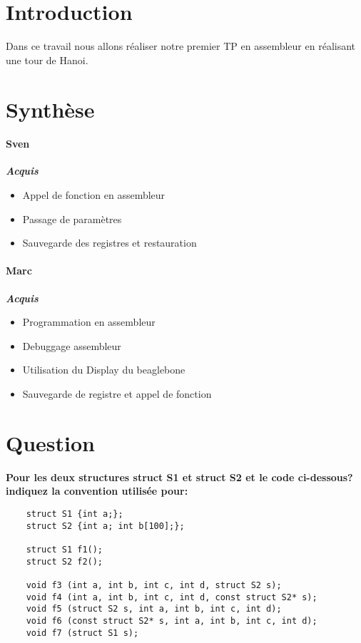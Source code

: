 \section{Introduction}
Dans ce travail nous allons réaliser notre premier TP en assembleur en réalisant une tour de Hanoi.
\section{Synthèse}

\paragraph{Sven}

\textbf{\textit{Acquis}}
\begin{itemize}
    \item Appel de fonction en assembleur
    \item Passage de paramètres
    \item Sauvegarde des registres et restauration
\end{itemize}

\paragraph{Marc}

\textbf{\textit{Acquis}}
\begin{itemize}
    \item Programmation en assembleur
    \item Debuggage assembleur
    \item Utilisation du Display du beaglebone
    \item Sauvegarde de registre et appel de fonction
\end{itemize}


\newpage
\section{Question}

\textbf{Pour les deux structures struct S1 et struct S2 et le code ci-dessous? indiquez la convention utilisée pour: }


\begin{lstlisting}
    struct S1 {int a;};
    struct S2 {int a; int b[100];};
    
    struct S1 f1();
    struct S2 f2();
    
    void f3 (int a, int b, int c, int d, struct S2 s);
    void f4 (int a, int b, int c, int d, const struct S2* s);
    void f5 (struct S2 s, int a, int b, int c, int d);
    void f6 (const struct S2* s, int a, int b, int c, int d);
    void f7 (struct S1 s);      
\end{lstlisting}

